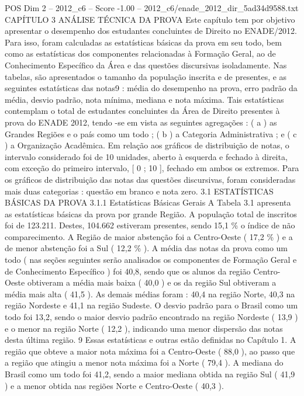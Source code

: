 \begin{textsample}{POS Dim 2 – 2012\_c6 – Score -1.00 – 2012\_c6/enade\_2012\_dir\_5ad34d9588.txt}  \label{ex:f2_pos_248}
CAPÍTULO 3 ANÁLISE TÉCNICA DA PROVA Este capítulo tem por objetivo apresentar o desempenho dos estudantes concluintes de Direito no ENADE/2012.
Para isso, foram calculadas as estatísticas básicas da prova em seu todo, bem como as estatísticas dos componentes relacionadas à Formação Geral, ao de Conhecimento Específico da Área e das questões discursivas isoladamente.
Nas tabelas, são apresentados o tamanho da população inscrita e de presentes, e as seguintes estatísticas das notas9 : média do desempenho na prova, erro padrão da média, desvio padrão, nota mínima, mediana e nota máxima.
Tais estatísticas contemplam o total de estudantes concluintes da Área de Direito presentes à prova do ENADE 2012, tendo -se em vista as seguintes agregações : ( a ) as Grandes Regiões e o país como um todo ; ( b ) a Categoria Administrativa ; e ( c ) a Organização Acadêmica.
Em relação aos gráficos de distribuição de notas, o intervalo considerado foi de 10 unidades, aberto à esquerda e fechado à direita, com exceção do primeiro intervalo, [ 0 ; 10 ], fechado em ambos os extremos.
Para os gráficos de distribuição das notas das questões discursivas, foram consideradas mais duas categorias : questão em branco e nota zero. 3.1 ESTATÍSTICAS BÁSICAS DA PROVA 3.1.1 Estatísticas Básicas Gerais A Tabela 3.1 apresenta as estatísticas básicas da prova por grande Região.
A população total de inscritos foi de 123.211.
Destes, 104.662 estiveram presentes, sendo 15,1 \% o índice de não comparecimento.
A Região de maior abstenção foi a Centro-Oeste ( 17,2 \% ) e a de menor abstenção foi a Sul ( 12,2 \% ).
A média das notas da prova como um todo ( nas seções seguintes serão analisados os componentes de Formação Geral e de Conhecimento Específico ) foi 40,8, sendo que os alunos da região Centro-Oeste obtiveram a média mais baixa ( 40,0 ) e os da região Sul obtiveram a média mais alta ( 41,5 ).
As demais médias foram : 40,4 na região Norte, 40,3 na região Nordeste e 41,1 na região Sudeste.
O desvio padrão para o Brasil como um todo foi 13,2, sendo o maior desvio padrão encontrado na região Nordeste ( 13,9 ) e o menor na região Norte ( 12,2 ), indicando uma menor dispersão das notas desta última região. 9 Essas estatísticas e outras estão definidas no Capítulo 1.
A região que obteve a maior nota máxima foi a Centro-Oeste ( 88,0 ), ao passo que a região que atingiu a menor nota máxima foi a Norte ( 79,4 ).
A mediana do Brasil como um todo foi 41,2, sendo a maior mediana obtida na região Sul ( 41,9 ) e a menor obtida nas regiões Norte e Centro-Oeste ( 40,3 ).

\end{textsample}
